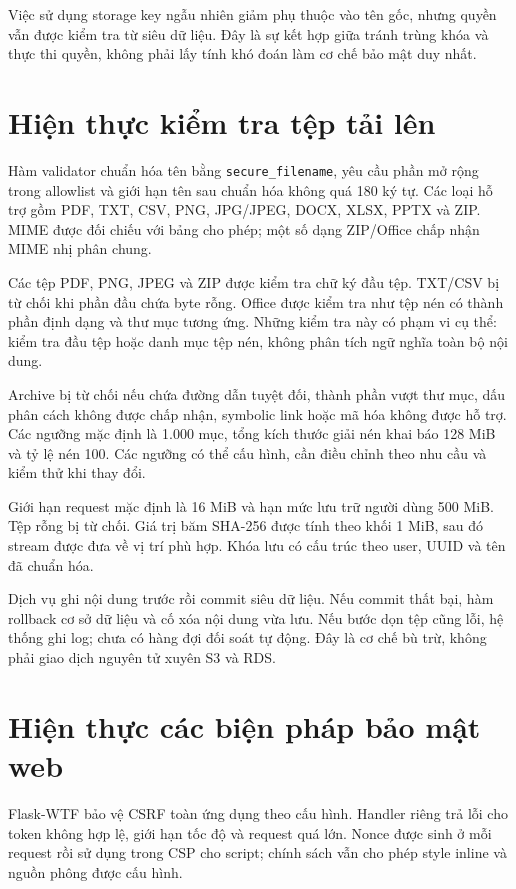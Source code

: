 Việc sử dụng storage key ngẫu nhiên giảm phụ thuộc vào tên gốc, nhưng quyền vẫn được kiểm tra từ siêu dữ liệu. Đây là sự kết hợp giữa tránh trùng khóa và thực thi quyền, không phải lấy tính khó đoán làm cơ chế bảo mật duy nhất.

\section{Hiện thực kiểm tra tệp tải lên}
Hàm validator chuẩn hóa tên bằng \texttt{secure\_filename}, yêu cầu phần mở rộng trong allowlist và giới hạn tên sau chuẩn hóa không quá 180 ký tự. Các loại hỗ trợ gồm PDF, TXT, CSV, PNG, JPG/JPEG, DOCX, XLSX, PPTX và ZIP. MIME được đối chiếu với bảng cho phép; một số dạng ZIP/Office chấp nhận MIME nhị phân chung.

Các tệp PDF, PNG, JPEG và ZIP được kiểm tra chữ ký đầu tệp. TXT/CSV bị từ chối khi phần đầu chứa byte rỗng. Office được kiểm tra như tệp nén có thành phần định dạng và thư mục tương ứng. Những kiểm tra này có phạm vi cụ thể: kiểm tra đầu tệp hoặc danh mục tệp nén, không phân tích ngữ nghĩa toàn bộ nội dung.

Archive bị từ chối nếu chứa đường dẫn tuyệt đối, thành phần vượt thư mục, dấu phân cách không được chấp nhận, symbolic link hoặc mã hóa không được hỗ trợ. Các ngưỡng mặc định là 1.000 mục, tổng kích thước giải nén khai báo 128 MiB và tỷ lệ nén 100. Các ngưỡng có thể cấu hình, cần điều chỉnh theo nhu cầu và kiểm thử khi thay đổi.

Giới hạn request mặc định là 16 MiB và hạn mức lưu trữ người dùng 500 MiB. Tệp rỗng bị từ chối. Giá trị băm SHA-256 được tính theo khối 1 MiB, sau đó stream được đưa về vị trí phù hợp. Khóa lưu có cấu trúc theo user, UUID và tên đã chuẩn hóa.

Dịch vụ ghi nội dung trước rồi commit siêu dữ liệu. Nếu commit thất bại, hàm rollback cơ sở dữ liệu và cố xóa nội dung vừa lưu. Nếu bước dọn tệp cũng lỗi, hệ thống ghi log; chưa có hàng đợi đối soát tự động. Đây là cơ chế bù trừ, không phải giao dịch nguyên tử xuyên S3 và RDS.

\section{Hiện thực các biện pháp bảo mật web}
Flask-WTF bảo vệ CSRF toàn ứng dụng theo cấu hình. Handler riêng trả lỗi cho token không hợp lệ, giới hạn tốc độ và request quá lớn. Nonce được sinh ở mỗi request rồi sử dụng trong CSP cho script; chính sách vẫn cho phép style inline và nguồn phông được cấu hình.

